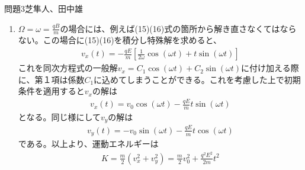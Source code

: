 \documentclass[fleqn]{jbook}
\begin{document}
\begin{answer}{問題3}{芝隼人、田中雄}
\begin{enumerate}
\begin{eqnarray}
\begin{array}{rl}{}
					  v_x (t) &= C_1 \cos (\omega t)+C_2 \sin (\omega t)  - \displaystyle\frac{qE}{m\omega}(\Omega +\omega)\cos(\omega t) \left[ \frac{\cos (\Omega +\omega )t}{2(\Omega +\omega )}-\frac{\cos (\Omega -\omega )t}{2(\Omega -\omega )}\right] \\
					  & \quad \qquad - \displaystyle\frac{qE}{m\omega} (\Omega +\omega )\sin (\omega t)\left[ \frac{\sin (\Omega +\omega )t}{2(\Omega +\omega)}+\frac{\sin (\Omega -\omega )t}{2(\Omega -\omega)}\right] \\
					  &= \displaystyle C_1\cos (\omega t) + C_2 \sin (\omega t) + \frac{qE}{m(\Omega -\omega )} \cos(\Omega t)
					  \end{array}
					  \end{eqnarray}
					  と求まる。初期条件は$v_x(0) = v_0, v_x'(0) = 0\ $(i.e. $ v_y(0)=0)$なので、$C_1 = v_0,\ C_2 = -c_2 (0) = 0$となる。以上から、
					  \begin{eqnarray}
					  v_x (t) = \left( v_0 -\frac{qE}{m(\Omega -\omega)}\right)\cos (\omega t) +\frac{qE}{m(\Omega-\omega )}\cos (\Omega t)
					  \end{eqnarray}
					  と求まる。同様にして$v_y$も
					  \begin{eqnarray}
					  v_y(t) = -\left( v_0 -\frac{qE}{m(\Omega -\omega )}\right)\sin (\omega t) -\frac{qE}{m(\Omega -\omega)}\sin (\Omega t)
					  \end{eqnarray}
					  と分かる。
					  \item
					  $\Omega =\omega = \frac{qB}{m}$の場合には、例えば(15)(16)式の箇所から解き直さなくてはならない。この場合に(15)(16)を積分し特殊解を求めると、
					  \begin{eqnarray}
					  v_x(t) = -\frac{qE}{m}\left[ \frac{1}{2\omega}\cos (\omega t) +t\sin (\omega t)\right]
					  \end{eqnarray}
					  これを同次方程式の一般解$v_x = C_1 \cos (\omega t)+C_2 \sin (\omega t)$に付け加える際に、第１項は係数$C_1$に込めてしまうことができる。これを考慮した上で初期条件を適用すると$v_x$の解は
					  \begin{eqnarray}
					  v_x(t) = v_0\cos (\omega t) -\frac{qE}{m}t \sin (\omega t)
					  \end{eqnarray}
					  となる。同じ様にして$v_y$の解は
					  \begin{eqnarray}
					  v_y(t) = -v_0\sin (\omega t) -\frac{qE}{m}t\cos (\omega t)
					  \end{eqnarray}
					  である。以上より、運動エネルギーは
					  \begin{eqnarray}
					  K = \frac{m}{2}(v_x^2 + v_y^2)= \frac{m}{2}v_0^2 + \frac{q^2 E^2}{2m}  t^2

\end{eqnarray}
\end{enumerate}
\end{answer}
\end{document}
